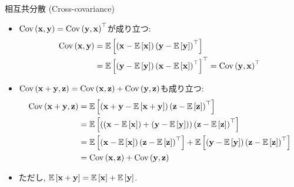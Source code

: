 \documentclass[dvipdfmx,notheorems,t]{beamer}
\begin{document}
\begin{frame}{相互共分散 (Cross-covariance)}
\begin{itemize}
  \item $\Cov{\vb{x}}{\vb{y}} = \Cov{\vb{y}}{\vb{x}}^\top$が成り立つ:
  \begin{align*}
    \Cov{\vb{x}}{\vb{y}}
      &= \E{\left( \vb{x} - \E{\vb{x}} \right) \left( \vb{y} - \E{\vb{y}} \right)^\top} \\
      &= \E{\left( \vb{y} - \E{\vb{y}} \right) \left( \vb{x} - \E{\vb{x}} \right)^\top}^\top
      = \Cov{\vb{y}}{\vb{x}}^\top
  \end{align*}
  \item $\Cov{\vb{x} + \vb{y}}{\vb{z}} = \Cov{\vb{x}}{\vb{z}} + \Cov{\vb{y}}{\vb{z}}$も成り立つ:
  {\small \begin{align*}
    \Cov{\vb{x} + \vb{y}}{\vb{z}}
      &= \E{\left( \vb{x} + \vb{y} - \E{\vb{x} + \vb{y}} \right)
        \left( \vb{z} - \E{\vb{z}} \right)^\top} \\
      &= \E{\left( \left( \vb{x} - \E{\vb{x}} \right) + \left( \vb{y} - \E{\vb{y}} \right) \right)
        \left( \vb{z} - \E{\vb{z}} \right)^\top} \\
      &= \E{\left( \vb{x} - \E{\vb{x}} \right) \left( \vb{z} - \E{\vb{z}} \right)^\top}
        + \E{\left( \vb{y} - \E{\vb{y}} \right) \left( \vb{z} - \E{\vb{z}} \right)^\top} \\
      &= \Cov{\vb{x}}{\vb{z}} + \Cov{\vb{y}}{\vb{z}}
  \end{align*}}
  \item ただし, $\E{\vb{x} + \vb{y}} = \E{\vb{x}} + \E{\vb{y}}$.
\end{itemize}
\end{frame}
\end{document}
